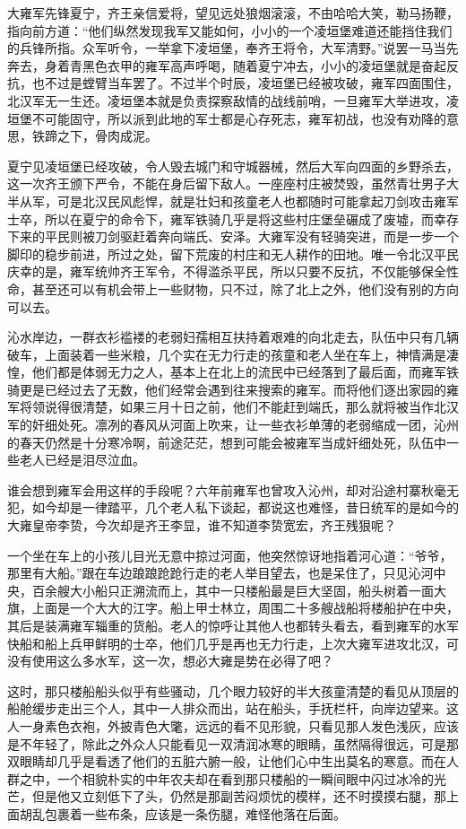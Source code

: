 大雍军先锋夏宁，齐王亲信爱将，望见远处狼烟滚滚，不由哈哈大笑，勒马扬鞭，指向前方道：“他们纵然发现我军又能如何，小小的一个凌垣堡难道还能挡住我们的兵锋所指。众军听令，一举拿下凌垣堡，奉齐王将令，大军清野。”说罢一马当先奔去，身着青黑色衣甲的雍军高声呼喝，随着夏宁冲去，小小的凌垣堡就是奋起反抗，也不过是螳臂当车罢了。不过半个时辰，凌垣堡已经被攻破，雍军四面围住，北汉军无一生还。凌垣堡本就是负责探察敌情的战线前哨，一旦雍军大举进攻，凌垣堡不可能固守，所以派到此地的军士都是心存死志，雍军初战，也没有劝降的意思，铁蹄之下，骨肉成泥。

夏宁见凌垣堡已经攻破，令人毁去城门和守城器械，然后大军向四面的乡野杀去，这一次齐王颁下严令，不能在身后留下敌人。一座座村庄被焚毁，虽然青壮男子大半从军，可是北汉民风彪悍，就是壮妇和孩童老人也都随时可能拿起刀剑攻击雍军士卒，所以在夏宁的命令下，雍军铁骑几乎是将这些村庄堡垒碾成了废墟，而幸存下来的平民则被刀剑驱赶着奔向端氏、安泽。大雍军没有轻骑突进，而是一步一个脚印的稳步前进，所过之处，留下荒废的村庄和无人耕作的田地。唯一令北汉平民庆幸的是，雍军统帅齐王军令，不得滥杀平民，所以只要不反抗，不仅能够保全性命，甚至还可以有机会带上一些财物，只不过，除了北上之外，他们没有别的方向可以去。

沁水岸边，一群衣衫褴褛的老弱妇孺相互扶持着艰难的向北走去，队伍中只有几辆破车，上面装着一些米粮，几个实在无力行走的孩童和老人坐在车上，神情满是凄惶，他们都是体弱无力之人，基本上在北上的流民中已经落到了最后面，而雍军铁骑更是已经过去了无数，他们经常会遇到往来搜索的雍军。而将他们逐出家园的雍军将领说得很清楚，如果三月十日之前，他们不能赶到端氏，那么就将被当作北汉军的奸细处死。凛冽的春风从河面上吹来，让一些衣衫单薄的老弱缩成一团，沁州的春天仍然是十分寒冷啊，前途茫茫，想到可能会被雍军当成奸细处死，队伍中一些老人已经是泪尽泣血。

谁会想到雍军会用这样的手段呢？六年前雍军也曾攻入沁州，却对沿途村寨秋毫无犯，如今却是一律踏平，几个老人私下谈起，都说这也难怪，昔日统军的是如今的大雍皇帝李贽，今次却是齐王李显，谁不知道李贽宽宏，齐王残狠呢？

一个坐在车上的小孩儿目光无意中掠过河面，他突然惊讶地指着河心道：“爷爷，那里有大船。”跟在车边踉踉跄跄行走的老人举目望去，也是呆住了，只见沁河中央，百余艘大小船只正溯流而上，其中一只楼船最是巨大坚固，船头树着一面大旗，上面是一个大大的江字。船上甲士林立，周围二十多艘战船将楼船护在中央，其后是装满雍军辎重的货船。老人的惊呼让其他人也都转头看去，看到雍军的水军快船和船上兵甲鲜明的士卒，他们几乎是再也无力行走，上次大雍军进攻北汉，可没有使用这么多水军，这一次，想必大雍是势在必得了吧？

这时，那只楼船船头似乎有些骚动，几个眼力较好的半大孩童清楚的看见从顶层的船舱缓步走出三个人，其中一人排众而出，站在船头，手抚栏杆，向岸边望来。这人一身素色衣袍，外披青色大氅，远远的看不见形貌，只看见那人发色浅灰，应该是不年轻了，除此之外众人只能看见一双清润冰寒的眼睛，虽然隔得很远，可是那双眼睛却几乎是看透了他们的五脏六腑一般，让他们心中生出莫名的寒意。而在人群之中，一个相貌朴实的中年农夫却在看到那只楼船的一瞬间眼中闪过冰冷的光芒，但是他又立刻低下了头，仍然是那副苦闷烦忧的模样，还不时摸摸右腿，那上面胡乱包裹着一些布条，应该是一条伤腿，难怪他落在后面。


